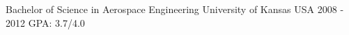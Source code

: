 \begin{cventries}
  \cveduentry
    {Bachelor of Science in Aerospace Engineering} %
    {}
    {University of Kansas} %
    {USA} %
    {2008 - 2012} %
    {GPA: 3.7/4.0}
\end{cventries}
